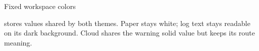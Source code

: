 \begin{standardframe}{Fixed workspace colors}

\medskip\par {} stores values shared by both themes. Paper stays white; log text stays readable on its dark background. Cloud shares the warning solid value but keeps its route meaning.
\end{standardframe}
